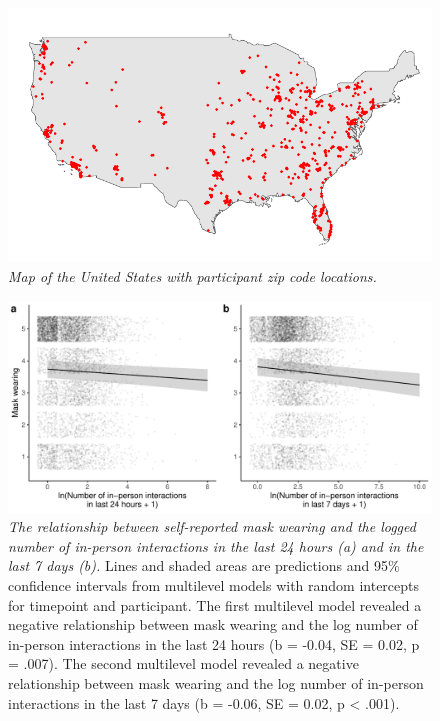 \documentclass[
  man, donotrepeattitle,floatsintext]{apa6}
\begin{document}
\begin{figure}
\centering
\includegraphics{manuscript_files/figure-latex/plotUSMap-1.pdf}
\caption{\label{fig:plotUSMap}\emph{Map of the United States with participant zip code locations.}}
\end{figure}

\newpage



\begin{figure}
\centering
\includegraphics{manuscript_files/figure-latex/plotIntFreq-1.pdf}
\caption{\label{fig:plotIntFreq}\emph{The relationship between self-reported mask wearing and the logged number of in-person interactions in the last 24 hours (a) and in the last 7 days (b).} Lines and shaded areas are predictions and 95\% confidence intervals from multilevel models with random intercepts for timepoint and participant. The first multilevel model revealed a negative relationship between mask wearing and the log number of in-person interactions in the last 24 hours (b = -0.04, SE = 0.02, p = .007). The second multilevel model revealed a negative relationship between mask wearing and the log number of in-person interactions in the last 7 days (b = -0.06, SE = 0.02, p \textless{} .001).}
\end{figure}
\end{document}
